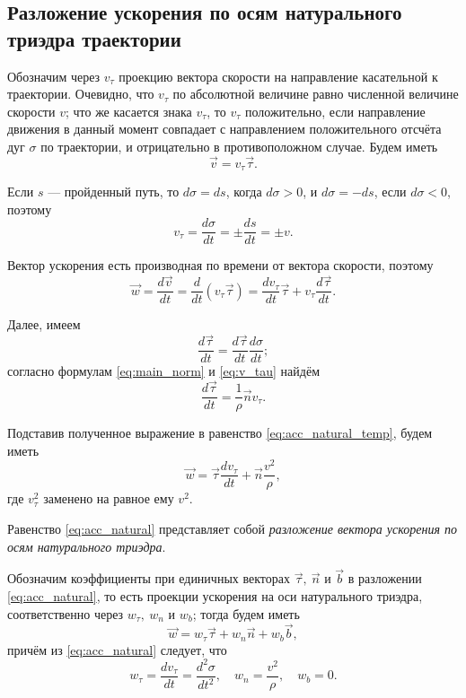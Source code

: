 \documentclass{article}
\theoremstyle{definition}
\theoremstyle{plain}
\theoremstyle{remark}
\numberwithin{equation}{section}
\newcommand{\der}[2][]{\frac{d #1}{d #2}}
\newcommand{\sder}[2][]{\frac{d^2 #1}{d #2^2}}
\newcommand{\dt}[1][]{\der[#1]{t}}
\newcommand{\ddt}[1][]{\sder[#1]{t}}
\begin{document}
\subsection{Разложение ускорения по осям натурального триэдра траектории}

Обозначим через $v_\tau$ проекцию вектора скорости на направление касательной
к траектории. Очевидно, что $v_\tau$ по абсолютной величине равно численной
величине скорости $v$; что же касается знака $v_\tau$, то $v_\tau$ положительно,
если направление движения в данный момент совпадает с направлением
положительного отсчёта дуг $\sigma$ по траектории, и отрицательно в
противоположном случае. Будем иметь
\begin{equation}
  \label{eq:vel_natural}
  \vec{v} = v_\tau \vec{\tau}.
\end{equation}

Если $s$ --- пройденный путь, то $d \sigma = ds$, когда $d \sigma > 0$, и
$d \sigma = -ds$, если $d \sigma <0$, поэтому
\begin{equation}
  \label{eq:v_tau}
  v_\tau = \dt[\sigma] = \pm \dt[s] = \pm v.
\end{equation}

Вектор ускорения есть производная по времени от вектора скорости, поэтому
\begin{equation}
  \label{eq:acc_natural_temp}
  \vec{w} = \dt[\vec{v}] = \dt (v_\tau \vec{\tau}) = \dt[v_\tau] \vec{\tau} +
    v_\tau \dt[\vec{\tau}].
\end{equation}

Далее, имеем
\begin{equation*}
  \dt[\vec{\tau}] = \dt[\vec{\tau}] \dt[\sigma];
\end{equation*}
согласно формулам \ref{eq:main_norm} и \ref{eq:v_tau} найдём
\begin{equation*}
  \dt[\vec{\tau}] = \frac{1}{\rho} \vec{n} v_\tau.
\end{equation*}

Подставив полученное выражение в равенство \ref{eq:acc_natural_temp}, будем
иметь
\begin{equation}
  \label{eq:acc_natural}
  \vec{w} = \vec{\tau} \dt[v_\tau] + \vec{n} \frac{v^2}{\rho},
\end{equation}
где $v_\tau^2$ заменено на равное ему $v^2$.

Равенство \ref{eq:acc_natural} представляет собой \textit{разложение вектора
ускорения по осям натурального триэдра}.

Обозначим коэффициенты при единичных векторах $\vec{\tau},~\vec{n}$ и $\vec{b}$
в разложении \ref{eq:acc_natural}, то есть проекции ускорения на оси
натурального триэдра, соответственно через $w_\tau,~w_n$ и $w_b$; тогда будем
иметь
\begin{equation}
  \label{eq:acc_natural_general}
  \vec{w} = w_\tau \vec{\tau} + w_n \vec{n} + w_b \vec{b},
\end{equation}
причём из \autoref{eq:acc_natural} следует, что
\begin{equation*}
  w_\tau = \dt[v_\tau] = \ddt[\sigma], \quad w_n = \frac{v^2}{\rho},
    \quad w_b = 0.
\end{equation*}
\end{document}
